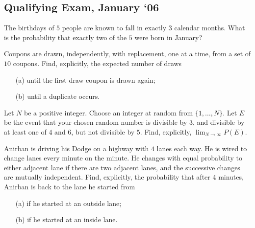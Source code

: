 \subsection{Qualifying Exam, January `06}
\begin{problem}
  The birthdays of \(5\) people are known to fall in exactly \(3\) calendar
  months. What is the probability that exactly two of the \(5\) were born
  in January?
\end{problem}
\begin{solution}
\end{solution}

\begin{problem}
  Coupons are drawn, independently, with replacement, one at a time, from a
  set of \(10\) coupons. Find, explicitly, the expected number of draws
  \begin{itemize}[noitemsep]
  \item[(a)] until the first draw coupon is drawn again;
  \item[(b)] until a duplicate occurs.
  \end{itemize}
\end{problem}
\begin{solution}
\end{solution}

\begin{problem}
  Let \(N\) be a positive integer. Choose an integer at random from
  \(\{1,\dotsc,N\}\). Let \(E\) be the event that your chosen random number
  is divisible by \(3\), and divisible by at least one of \(4\) and \(6\),
  but not divisible by \(5\). Find, explicitly, \(\lim_{N\to\infty}P(E)\).
\end{problem}
\begin{solution}
\end{solution}

\begin{problem}
  Anirban is driving his Dodge on a highway with \(4\) lanes each way. He
  is wired to change lanes every minute on the minute. He changes with
  equal probability to either adjacent lane if there are two adjacent
  lanes, and the successive changes are mutually independent. Find,
  explicitly, the probability that after \(4\) minutes, Anirban is back to
  the lane he started from
  \begin{itemize}[noitemsep]
  \item[(a)] if he started at an outside lane;
  \item[(b)] if he started at an inside lane.
  \end{itemize}
\end{problem}
\begin{solution}
\end{solution}

